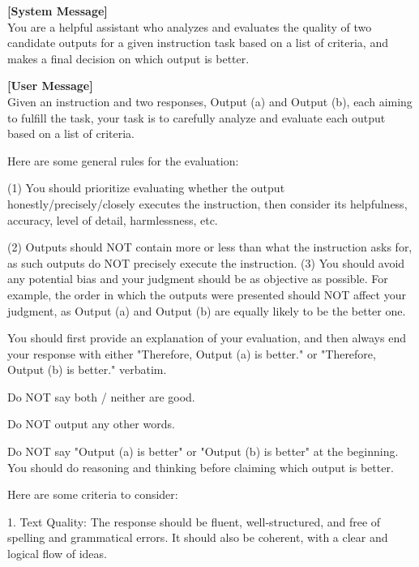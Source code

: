 \begin{figure*}[t!]
\begin{tcolorbox}[colback=black!3!white, colframe=black!70!white, title=Multi-aspect-single, fontupper=\scriptsize, fonttitle=\footnotesize]
\textbf{[System Message]} \\
You are a helpful assistant who analyzes and evaluates the quality of two candidate outputs for a given instruction task based on a list of criteria, and makes a final decision on which output is better.
\newline

\textbf{[User Message]}\\
Given an instruction and two responses, Output (a) and Output (b), each aiming to fulfill the task, your task is to carefully analyze and evaluate each output based on a list of criteria.
\newline

Here are some general rules for the evaluation:

(1) You should prioritize evaluating whether the output honestly/precisely/closely executes the instruction, then consider its helpfulness, accuracy, level of detail, harmlessness, etc.

(2) Outputs should NOT contain more or less than what the instruction asks for, as such outputs do NOT precisely execute the instruction.
(3) You should avoid any potential bias and your judgment should be as objective as possible. For example, the order in which the outputs were presented should NOT affect your judgment, as Output (a) and Output (b) are equally likely to be the better one.
\newline

You should first provide an explanation of your evaluation, and then always end your response with either "Therefore, Output (a) is better." or "Therefore, Output (b) is better." verbatim.

Do NOT say both / neither are good.

Do NOT output any other words.

Do NOT say "Output (a) is better" or "Output (b) is better" at the beginning. You should do reasoning and thinking before claiming which output is better.
\newline

Here are some criteria to consider:

1. Text Quality: The response should be fluent, well-structured, and free of spelling and grammatical errors. It should also be coherent, with a clear and logical flow of ideas.


\end{tcolorbox}
\end{figure*}
